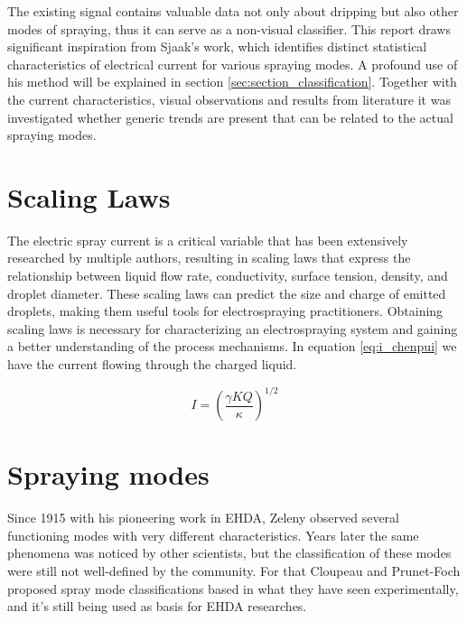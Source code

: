   The existing signal contains valuable data not only about dripping but also other modes of spraying, thus it can serve as a non-visual classifier.
  This report draws significant inspiration from Sjaak's\cite{Sjaaks} work, which identifies distinct statistical characteristics of electrical current for various spraying modes.
  A profound use of his method will be explained in section \ref{sec:section_classification}.
  Together with the current characteristics, visual observations and results from literature it was investigated whether generic trends are present that can be related to the actual spraying modes.


\section{Scaling Laws}
\label{sec:scalling-laws}

The electric spray current is a critical variable that has been extensively researched by multiple authors\cite{prunet}\cite{Chen_Pui}\cite{gananCalvo}, resulting in scaling laws that express the relationship between liquid flow rate, conductivity, surface tension, density, and droplet diameter. 
These scaling laws can predict the size and charge of emitted droplets, making them useful tools for electrospraying practitioners. 
Obtaining scaling laws is necessary for characterizing an electrospraying system and gaining a better understanding of the process mechanisms. 
In equation \ref{eq:i_chenpui} we have the current flowing through the charged liquid.

\begin{equation}\label{eq:i_chenpui}
	I = (\frac{\gamma K Q}{\kappa})^{1/2}
\end{equation}

\section{Spraying modes}
\label{sec:spraying_modes_subsec}

Since 1915 with his pioneering work in EHDA, Zeleny\cite{zeleny14} observed several functioning modes with very different characteristics.
Years later the same phenomena was noticed by other scientists, but the classification of these modes were still not well-defined by the community.
For that Cloupeau and Prunet-Foch\cite{prunet} proposed spray mode classifications based in what they have seen experimentally, and it's still being used as basis for EHDA researches.


